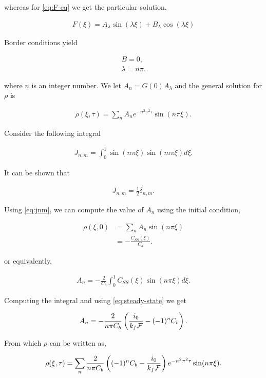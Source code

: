 whereas for \ref{eq:F-eq} we get the particular solution,

\begin{align}
	F(\xi) = A_\lambda\sin(\lambda \xi) + B_\lambda\cos(\lambda \xi)
\end{align}

Border conditions yield 

\begin{align}
	B = 0,\\
	\lambda = n\pi.
\end{align}

where $n$ is an integer number. We let $A_n = G(0) A_\lambda$ and the general solution for $\rho$ is

\begin{align}
	\rho(\xi, \tau) = \sum_n A_n e^{-n^2\pi^2 \tau}\sin(n\pi \xi).
\end{align}


Consider the following integral

\begin{align}
	J_{n,m} = \int_0^1 \sin(n\pi\xi) \sin(m\pi\xi) d\xi.
\end{align}

It can be shown that 

\begin{align}
	J_{n,m} = \frac{1}{2}\delta_{n,m}.
	\label{eq:jnm}
\end{align}

Using \ref{eq:jnm}, we can compute the value of $A_n$ using the initial condition,

\begin{align}
	\rho(\xi, 0) &= \sum_n A_n \sin(n\pi\xi)\\
	 &= -\frac{C_{SS}(\xi)}{C_b}.
\end{align}

or equivalently,

\begin{align}
	A_n = -\frac{2}{C_b} \int_0^1 C_{SS}(\xi)\sin(n\pi\xi) d\xi.
\end{align}

Computing the integral and using \ref{eq:steady-state} we get

\begin{align}
	A_n = -\frac{2}{n\pi C_b} \left({\frac{i_0}{k_f\mathcal{F}} - (-1)^n C_b}\right).
\end{align}


From which $\rho$ can be written as,

\begin{align}
	\rho(\xi, \tau) = \sum_n \frac{2}{n\pi C_b} \left({(-1)^n C_b- \frac{i_0}{k_f\mathcal{F}}}\right) e^{-n^2\pi^2\tau}\sin(n\pi\xi).
\end{align}


